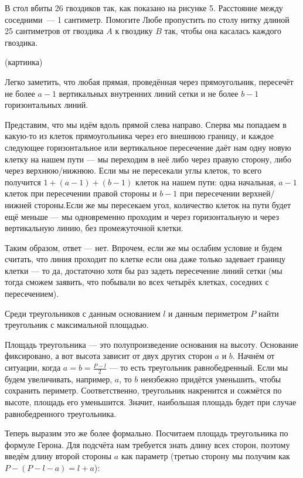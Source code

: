 \begin{itemize}
\itA В стол вбиты 26 гвоздиков так, как показано на рисунке 5. Расстояние между соседними~— 1 сантиметр. Помогите Любе пропустить по столу нитку длиной 25 сантиметров от гвоздика $A$ к гвоздику $B$ так, чтобы она касалась каждого гвоздика.

(картинка)

\itB Легко заметить, что любая прямая, проведённая через прямоугольник, пересечёт не более $a-1$
вертикальных внутренних линий сетки и не более $b-1$ горизонтальных линий. 

Представим, что мы идём вдоль прямой слева направо. Сперва мы попадаем в какую-то из клеток прямоугольника через его внешнюю границу, и каждое следующее горизонтальное или вертикальное пересечение даёт нам одну новую клетку на нашем пути --- мы переходим в неё либо через правую сторону, либо через верхнюю/нижнюю. Если мы не пересекали углы клеток, то всего получится $1 + (a-1) + (b-1)$ клеток на нашем пути: одна начальная, $a-1$ клеток при пересечении правой стороны и $b-1$ при пересечении верхней/нижней стороны.Если же мы пересекаем угол, количество клеток на пути будет ещё меньше --- мы одновременно проходим и через горизонтальную и через вертикальную линию, без промежуточной клетки.

Таким образом, ответ --- нет. Впрочем, если же мы ослабим условие и будем считать, что линия проходит по клетке если она даже только задевает границу клетки --- то да, достаточно хотя бы раз задеть пересечение линий сетки (мы тогда сможем заявить, что побывали во всех четырёх клетках, соседних с пересечением). 

\itC Среди треугольников с данным основанием $l$ и данным периметром $P$ найти треугольник с максимальной площадью.

Площадь треугольника --- это полупроизведение основания на высоту. Основание фиксировано, а вот
высота зависит от двух других сторон $a$ и $b$. Начнём от ситуации, когда $a = b = \frac{P-l}{2}$ --- то есть треугольник равнобедренный. Если мы будем увеличивать, например, $a$, то $b$ неизбежно придётся уменьшить,
чтобы сохранить периметр. Соответственно, треугольник накренится и сожмётся по высоте, площадь его уменьшится.
Значит, наибольшая площадь будет при случае равнобедренного треугольника.

Теперь выразим это же более формально. 
Посчитаем площадь треугольника по формуле Герона. Для подсчёта нам требуется знать длину всех 
сторон, поэтому введём длину второй стороны $a$ как параметр (третью сторону мы получим как $P-(P-l-a) = l+a$):


\end{itemize}

